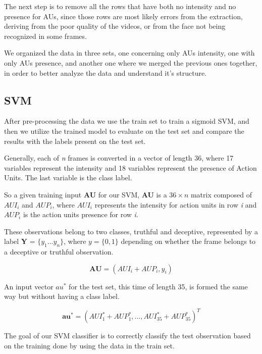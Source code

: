 The next step is to remove all the rows that have both no intensity and no presence for AUs, since those rows are most likely errors from the extraction, deriving from the poor quality of the videos, or from the face not being recognized in some frames.

We organized the data in three sets, one concerning only AUs intensity, one with only AUs presence, and another one where we merged the previous ones together, in order to better analyze the data and understand it's structure.

\subsection{SVM}

After pre-processing the data we use the train set to train a sigmoid %
SVM, and then we utilize the trained model to evaluate on the test set and compare the results with the labels present on the test set.

Generally, each of \textit{n} frames is converted in a vector of length 36, where 17 variables represent the intensity and 18 variables represent the presence of Action Units. The last variable is the class label.

So a given training input \textbf{AU} for our SVM, \textbf{AU} is a $36 \times n$ matrix composed of $AUI_i$ and $AUP_i$, where $AUI_i$ represents the intensity for action units in row \textit{i} and $AUP_i$ is the action units presence for row \textit{i}. 

These observations belong to two classes, truthful and deceptive, represented by a label \textbf{Y} = $\{y_1 \dots y_n\}$, where $y = \{0,1\}$ depending on whether the frame belongs to a deceptive or truthful observation.

\begin{equation}
	\mathbf{AU} = (AUI_i + AUP_i, y_i)
\end{equation}

An input vector $au^*$ for the test set, this time of length 35, is formed the same way but without having a class label.

\begin{equation}
	\mathbf{au^*} = (AUI^*_1 + AUP^*_1, \dots, AUI^*_{35} + AUP^*_{35})^T
\end{equation}

The goal of our SVM classifier is to correctly classify the test observation based on the training done by using the data in the train set.

